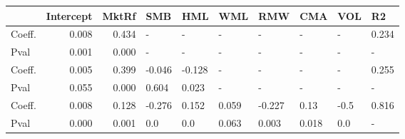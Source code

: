 \begin{tabular}{lrrlllllll}
\toprule
{} &  Intercept &  MktRf &    SMB &    HML &    WML &    RMW &    CMA &  VOL &     R2 \\
\midrule
Coeff.  &      0.008 &  0.434 &      - &      - &      - &      - &      - &    - &  0.234 \\
Pval    &      0.001 &  0.000 &      - &      - &      - &      - &      - &    - &      - \\
Coeff.  &      0.005 &  0.399 & -0.046 & -0.128 &      - &      - &      - &    - &  0.255 \\
Pval    &      0.055 &  0.000 &  0.604 &  0.023 &      - &      - &      - &    - &      - \\
Coeff.  &      0.008 &  0.128 & -0.276 &  0.152 &  0.059 & -0.227 &   0.13 & -0.5 &  0.816 \\
Pval    &      0.000 &  0.001 &    0.0 &    0.0 &  0.063 &  0.003 &  0.018 &  0.0 &      - \\
\bottomrule
\end{tabular}
